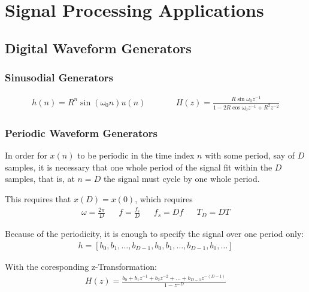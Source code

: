 \section{Signal Processing Applications}
\subsection{Digital Waveform Generators}
\subsubsection{Sinusodial Generators}
\begin{align*}
	h(n) = R^n \sin(\omega_0 n)u(n) \qquad
	&& H(z) = \frac{R \sin \omega_0 z^{-1}}{1-2R\cos \omega_0 z^{-1} + R^2 z^{-2}}
\end{align*}

\subsubsection{Periodic Waveform Generators}
In order for $x(n)$ to be periodic in the time index $n$ with some period, say of $D$ samples,
it is necessary that one whole period of the signal fit within the $D$ samples, that is,
at $n = D$ the signal must cycle by one whole period.

This requires that $x(D) = x(0)$, which requires
\begin{align*}
	\omega = \frac{2\pi}{D} && f = \frac{f_s}{D} && f_s = Df && T_D = DT
\end{align*}


Because of the periodicity, it is enough to specify the signal over one period only:
\begin{align*}
	h = [b_0, b_1, \ldots, b_{D-1}, b_0, b_1, \ldots, b_{D-1}, b_0, \ldots]
\end{align*}

With the coresponding z-Transformation:
\begin{align*}
	H(z) = \frac{b_0 + b_1 z^{-1} + b_2 z^{-2} + \ldots + b_{D-1} z^{-(D-1)}}{1 - z^{-D}}
\end{align*}

